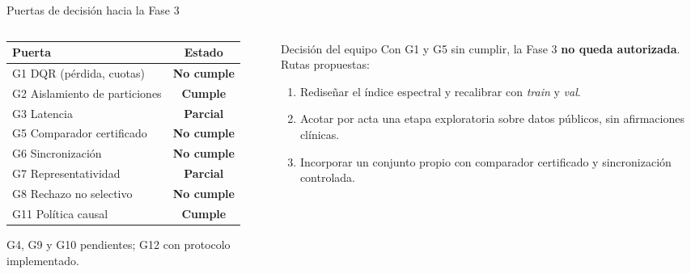 \documentclass[aspectratio=169]{beamer}
\newcommand{\cumple}{\textcolor{aasimverde}{\textbf{Cumple}}}
\newcommand{\nocumple}{\textcolor{aasimrojo}{\textbf{No cumple}}}
\newcommand{\parcial}{\textcolor{aasimazul}{\textbf{Parcial}}}
\begin{document}
\begin{frame}{Puertas de decisión hacia la Fase 3}
  \begin{columns}[T]
    \begin{column}{0.52\textwidth}
      \small
      \begin{tabular}{p{4.6cm}c}
        \toprule
        Puerta & Estado \\
        \midrule
        G1 DQR (pérdida, cuotas) & \nocumple \\
        G2 Aislamiento de particiones & \cumple \\
        G3 Latencia & \parcial \\
        G5 Comparador certificado & \nocumple \\
        G6 Sincronización & \nocumple \\
        G7 Representatividad & \parcial \\
        G8 Rechazo no selectivo & \nocumple \\
        G11 Política causal & \cumple \\
        \bottomrule
      \end{tabular}

      \vspace{0.3em}
      \footnotesize G4, G9 y G10 pendientes; G12 con protocolo implementado.
    \end{column}
    \begin{column}{0.44\textwidth}
      \begin{block}{Decisión del equipo}
        \small
        Con G1 y G5 sin cumplir, la Fase 3 \textbf{no queda autorizada}. Rutas propuestas:
        \begin{enumerate}
          \item Rediseñar el índice espectral y recalibrar con \textit{train} y \textit{val}.
          \item Acotar por acta una etapa exploratoria sobre datos públicos, sin
                afirmaciones clínicas.
          \item Incorporar un conjunto propio con comparador certificado y sincronización controlada.
        \end{enumerate}
      \end{block}
    \end{column}
  \end{columns}
\end{frame}
\end{document}

